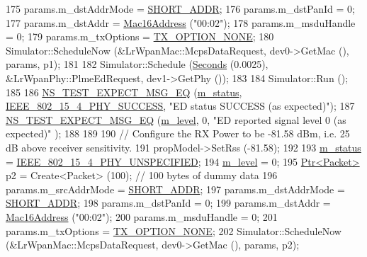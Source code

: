 \begin{DoxyCode}
175   params.m\_dstAddrMode = \hyperlink{group__lr-wpan_gga9ea4702ab11d5329e1593afebce06bbba7bf58267dde39bdabfeeb5793450c5e3}{SHORT\_ADDR};
176   params.m\_dstPanId = 0;
177   params.m\_dstAddr = \hyperlink{classns3_1_1Mac16Address}{Mac16Address} (\textcolor{stringliteral}{"00:02"});
178   params.m\_msduHandle = 0;
179   params.m\_txOptions = \hyperlink{group__lr-wpan_gga74ea891230ebf45d80d69a67266930a4a873c8b896435efcdd1c058668efb88ea}{TX\_OPTION\_NONE};
180   Simulator::ScheduleNow (&LrWpanMac::McpsDataRequest, dev0->GetMac (), params, p1);
181 
182   Simulator::Schedule (\hyperlink{group__timecivil_ga33c34b816f8ff6628e33d5c8e9713b9e}{Seconds} (0.0025), &LrWpanPhy::PlmeEdRequest, dev1->GetPhy ());
183 
184   Simulator::Run ();
185 
186   \hyperlink{group__testing_ga7304ba46a28d8cf08dfdfd6499cf7068}{NS\_TEST\_EXPECT\_MSG\_EQ} (\hyperlink{classLrWpanEdTestCase_a412f77be5f81e80661cf8e5563e62851}{m\_status}, 
      \hyperlink{group__lr-wpan_gga6494269d13d45c511a07b7ccbb1de754a2a81d56261f039e08cf2dd91de10b618}{IEEE\_802\_15\_4\_PHY\_SUCCESS}, \textcolor{stringliteral}{"ED status SUCCESS (as expected)"});
187   \hyperlink{group__testing_ga7304ba46a28d8cf08dfdfd6499cf7068}{NS\_TEST\_EXPECT\_MSG\_EQ} (\hyperlink{classLrWpanEdTestCase_a7ecaee7923b4d55cc4a8545bc0332469}{m\_level}, 0, \textcolor{stringliteral}{"ED reported signal level 0 (as expected)"}
      );
188 
189 
190   \textcolor{comment}{// Configure the RX Power to be -81.58 dBm, i.e. 25 dB above receiver sensitivity.}
191   propModel->SetRss (-81.58);
192 
193   \hyperlink{classLrWpanEdTestCase_a412f77be5f81e80661cf8e5563e62851}{m\_status} = \hyperlink{group__lr-wpan_gga6494269d13d45c511a07b7ccbb1de754a33aedad985a3e4dd7a0c6790a2c677a0}{IEEE\_802\_15\_4\_PHY\_UNSPECIFIED};
194   \hyperlink{classLrWpanEdTestCase_a7ecaee7923b4d55cc4a8545bc0332469}{m\_level} = 0;
195   \hyperlink{classns3_1_1Ptr}{Ptr<Packet>} p2 = Create<Packet> (100);  \textcolor{comment}{// 100 bytes of dummy data}
196   params.m\_srcAddrMode = \hyperlink{group__lr-wpan_gga9ea4702ab11d5329e1593afebce06bbba7bf58267dde39bdabfeeb5793450c5e3}{SHORT\_ADDR};
197   params.m\_dstAddrMode = \hyperlink{group__lr-wpan_gga9ea4702ab11d5329e1593afebce06bbba7bf58267dde39bdabfeeb5793450c5e3}{SHORT\_ADDR};
198   params.m\_dstPanId = 0;
199   params.m\_dstAddr = \hyperlink{classns3_1_1Mac16Address}{Mac16Address} (\textcolor{stringliteral}{"00:02"});
200   params.m\_msduHandle = 0;
201   params.m\_txOptions = \hyperlink{group__lr-wpan_gga74ea891230ebf45d80d69a67266930a4a873c8b896435efcdd1c058668efb88ea}{TX\_OPTION\_NONE};
202   Simulator::ScheduleNow (&LrWpanMac::McpsDataRequest, dev0->GetMac (), params, p2);

\end{DoxyCode}
